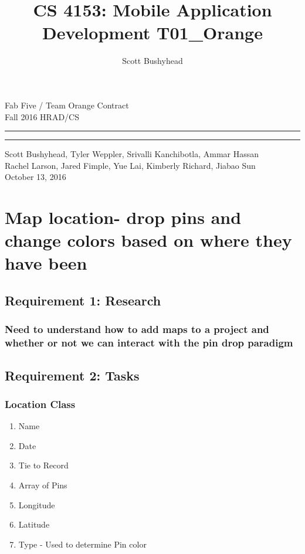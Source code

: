 \documentclass [10pt] {article}
\title{CS 4153: Mobile Application Development \newline
T01_Orange}
\author{Scott Bushyhead}
\begin{document}
\begin{flushright}
{\huge  Fab Five / Team Orange Contract}\\[5pt]
{\huge  Fall 2016 HRAD/CS}\\[15pt]
\vspace{4pt}
\hrule
\vspace{4pt}
\hrule
{\large  Scott Bushyhead, Tyler Weppler, Srivalli Kanchibotla, Ammar Hassan}\\[5pt]
{\large  Rachel Larson, Jared Fimple, Yue Lai, Kimberly Richard, Jiabao Sun}\\[5pt]
{\large October 13, 2016}\\[5pt]
\end{flushright}

\newpage


\section{Map location- drop pins and change colors based on where they have been}
\subsection{Requirement 1: Research}
\subsubsection{Need to understand how to add maps to a project and whether or not we can interact with the pin drop paradigm}
\subsection{Requirement 2: Tasks}
\subsubsection{Location Class}
\begin{enumerate}
\item Name
\item Date
\item Tie to Record
\item Array of Pins
\item Longitude
\item Latitude
\item Type - Used to determine Pin color
\end{enumerate}
\end{document}
